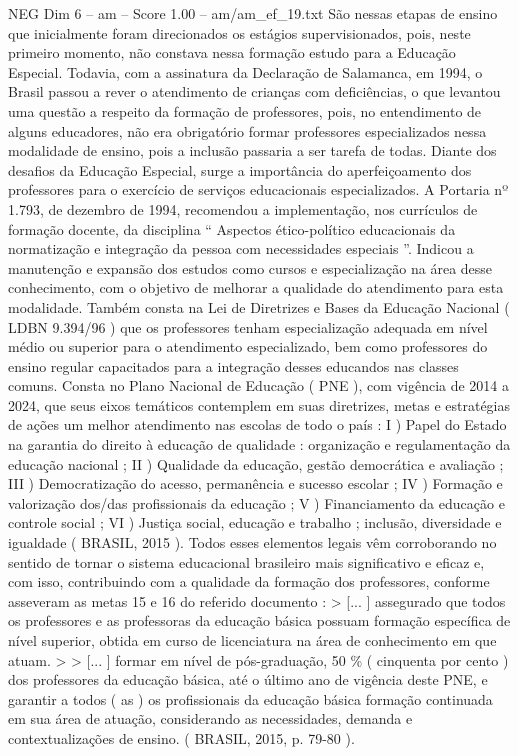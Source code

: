\begin{textsample}{NEG Dim 6 – am – Score 1.00 – am/am\_ef\_19.txt}
São nessas etapas de ensino que inicialmente foram direcionados os estágios supervisionados, pois, neste primeiro momento, não constava nessa formação estudo para a Educação Especial.
Todavia, com a assinatura da Declaração de Salamanca, em 1994, o Brasil passou a rever o atendimento de crianças com deficiências, o que levantou uma questão a respeito da formação de professores, pois, no entendimento de alguns educadores, não era obrigatório formar professores especializados nessa modalidade de ensino, pois a inclusão passaria a ser tarefa de todas.
Diante dos desafios da Educação Especial, surge a importância do aperfeiçoamento dos professores para o exercício de serviços educacionais especializados.
A Portaria nº 1.793, de dezembro de 1994, recomendou a implementação, nos currículos de formação docente, da disciplina “ Aspectos ético-político educacionais da normatização e integração da pessoa com necessidades especiais ”.
Indicou a manutenção e expansão dos estudos como cursos e especialização na área desse conhecimento, com o objetivo de melhorar a qualidade do atendimento para esta modalidade.
Também consta na Lei de Diretrizes e Bases da Educação Nacional ( LDBN 9.394/96 ) que os professores tenham especialização adequada em nível médio ou superior para o atendimento especializado, bem como professores do ensino regular capacitados para a integração desses educandos nas classes comuns.
Consta no Plano Nacional de Educação ( PNE ), com vigência de 2014 a 2024, que seus eixos temáticos contemplem em suas diretrizes, metas e estratégias de ações um melhor atendimento nas escolas de todo o país : I ) Papel do Estado na garantia do direito à educação de qualidade : organização e regulamentação da educação nacional ; II ) Qualidade da educação, gestão democrática e avaliação ; III ) Democratização do acesso, permanência e sucesso escolar ; IV ) Formação e valorização dos/das profissionais da educação ; V ) Financiamento da educação e controle social ; VI ) Justiça social, educação e trabalho ; inclusão, diversidade e igualdade ( BRASIL, 2015 ).
Todos esses elementos legais vêm corroborando no sentido de tornar o sistema educacional brasileiro mais significativo e eficaz e, com isso, contribuindo com a qualidade da formação dos professores, conforme asseveram as metas 15 e 16 do referido documento : > [... ] assegurado que todos os professores e as professoras da educação básica possuam formação específica de nível superior, obtida em curso de licenciatura na área de conhecimento em que atuam. > > [... ] formar em nível de pós-graduação, 50 \% ( cinquenta por cento ) dos professores da educação básica, até o último ano de vigência deste PNE, e garantir a todos ( as ) os profissionais da educação básica formação continuada em sua área de atuação, considerando as necessidades, demanda e contextualizações de ensino. ( BRASIL, 2015, p. 79-80 ).

\end{textsample}
